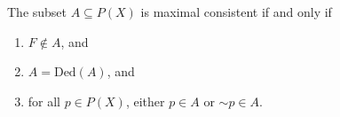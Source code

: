 The subset $A \subseteq P(X)$ is maximal consistent if and only if
\begin{enumerate}
\item[(i)] $F \notin A$, and
\item[(ii)] $A = \text{Ded}(A)$, and
\item[(iii)] for all $p \in P(X)$, either $p \in A$ or $\sim p \in A$.
\end{enumerate}

